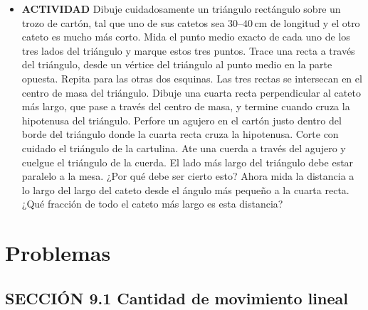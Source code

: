 \documentclass[11pt,a4paper]{article}
\begin{document}
\begin{itemize}
    \item[\textbf{2.}] \textbf{ACTIVIDAD} Dibuje cuidadosamente un triángulo rectángulo sobre un trozo de cartón, tal que uno de sus catetos sea \(30\text{--}40\,\text{cm}\) de longitud y el otro cateto es mucho más corto. Mida el punto medio exacto de cada uno de los tres lados del triángulo y marque estos tres puntos. Trace una recta a través del triángulo, desde un vértice del triángulo al punto medio en la parte opuesta. Repita para las otras dos esquinas. Las tres rectas se intersecan en el centro de masa del triángulo. Dibuje una cuarta recta perpendicular al cateto más largo, que pase a través del centro de masa, y termine cuando cruza la hipotenusa del triángulo. Perfore un agujero en el cartón justo dentro del borde del triángulo donde la cuarta recta cruza la hipotenusa. Corte con cuidado el triángulo de la cartulina. Ate una cuerda a través del agujero y cuelgue el triángulo de la cuerda. El lado más largo del triángulo debe estar paralelo a la mesa. ¿Por qué debe ser cierto esto? Ahora mida la distancia a lo largo del largo del cateto desde el ángulo más pequeño a la cuarta recta. ¿Qué fracción de todo el cateto más largo es esta distancia?
    \vspace*{7cm}
\end{itemize}

\newpage

\section*{Problemas}

\subsection*{SECCIÓN 9.1 Cantidad de movimiento lineal}
\end{document}
